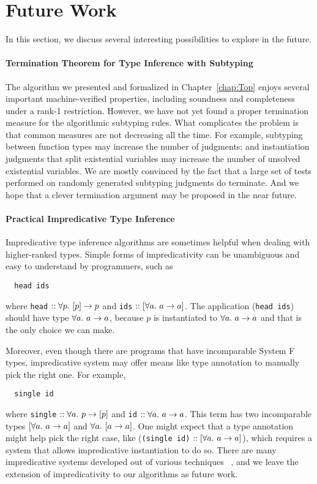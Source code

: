 \section{Future Work}

In this section, we discuss several interesting possibilities to explore in the future.

\paragraph{Termination Theorem for Type Inference with Subtyping}
The algorithm we presented and formalized in Chapter~\ref{chap:Top}
enjoys several important machine-verified properties,
including soundness and completeness under a rank-1 restriction.
However, we have not yet found a proper termination measure
for the algorithmic subtyping rules.
What complicates the problem is that
common measures are not decreasing all the time.
For example, subtyping between function types may increase the number of judgments;
and instantiation judgments that split existential variables may increase the number of
unsolved existential variables.
We are mostly convinced by the fact that
a large set of tests performed on randomly generated
subtyping judgments do terminate.
And we hope that a clever termination argument may be proposed in the near future.

\paragraph{Practical Impredicative Type Inference}
Impredicative type inference algorithms are sometimes helpful when dealing with
higher-ranked types.
Simple forms of impredicativity can be unambiguous and easy to understand by programmers,
such as
\begin{verbatim}
  head ids
\end{verbatim}
where \verb|head| $ :: \all[p] [p] \to p$ and \verb|ids| $ :: [\all a \to a]$.
The application (\verb|head ids|) should have type $\all a \to a$,
because $p$ is instantiated to $\all a \to a$ and that is the only choice we can make.

Moreover, even though there are programs that have incomparable System F types,
impredicative system may offer means like type annotation to manually pick the right one.
For example,
\begin{verbatim}
  single id
\end{verbatim}
where \verb|single| $ :: \all p \to [p]$ and \verb|id| $ :: \all a \to a$.
This term has two incomparable types $[\all a \to a]$ and $\all[a] [a \to a]$.
One might expect that a type annotation might help pick the right case,
like (\verb|(single id)| $ :: [\all a \to a]$),
which requires a system that allows impredicative instantiation to do so.
There are many impredicative systems developed out of various techniques~
\cite{le2003ml,leijen2008hmf,leijen2009flexible,vytiniotis2008fph,
Serrano2018,quicklook2020,FreezeML},
and we leave the extension of impredicativity to our algorithms as future work.

